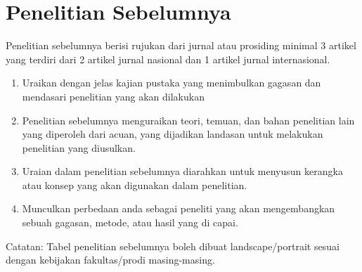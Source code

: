 \section{Penelitian Sebelumnya}
\begin{isi}
Penelitian sebelumnya berisi rujukan dari jurnal atau prosiding
minimal 3 artikel yang terdiri dari 2 artikel jurnal nasional dan
1 artikel jurnal internasional.
\begin{enumerate}[label=\arabic*., leftmargin=0cm]
  \item Uraikan dengan jelas kajian pustaka yang menimbulkan gagasan
        dan mendasari penelitian yang akan dilakukan
  \item Penelitian sebelumnya menguraikan teori, temuan, dan bahan
        penelitian lain yang diperoleh dari acuan, yang dijadikan
        landasan untuk melakukan penelitian yang diusulkan.
  \item Uraian dalam penelitian sebelumnya diarahkan untuk menyusun
        kerangka atau konsep yang akan digunakan dalam penelitian.
  \item Munculkan perbedaan anda sebagai peneliti yang akan
        mengembangkan sebuah gagasan, metode, atau hasil yang di capai.
\end{enumerate}

Catatan: Tabel penelitian sebelumnya boleh dibuat
landscape/portrait sesuai dengan kebijakan fakultas/prodi
masing-masing.

\end{isi}

